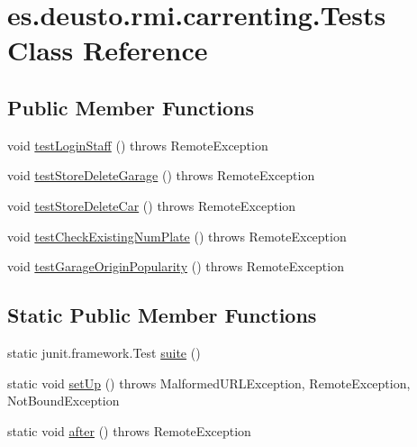 \hypertarget{classes_1_1deusto_1_1rmi_1_1carrenting_1_1_tests}{}\section{es.\+deusto.\+rmi.\+carrenting.\+Tests Class Reference}
\label{classes_1_1deusto_1_1rmi_1_1carrenting_1_1_tests}
\subsection*{Public Member Functions}
\begin{DoxyCompactItemize}
\item 
void \mbox{\hyperlink{classes_1_1deusto_1_1rmi_1_1carrenting_1_1_tests_ac0024402892b0be0c6a7e214c8594f82}{test\+Login\+Staff}} ()  throws Remote\+Exception 
\item 
void \mbox{\hyperlink{classes_1_1deusto_1_1rmi_1_1carrenting_1_1_tests_afc6f67fefbb2274c222cc554412d85c4}{test\+Store\+Delete\+Garage}} ()  throws Remote\+Exception 
\item 
void \mbox{\hyperlink{classes_1_1deusto_1_1rmi_1_1carrenting_1_1_tests_af8829dcf722f17efca1d53345b5a049a}{test\+Store\+Delete\+Car}} ()  throws Remote\+Exception 
\item 
void \mbox{\hyperlink{classes_1_1deusto_1_1rmi_1_1carrenting_1_1_tests_ab275c8fe4601f38f88adbe497c42fed2}{test\+Check\+Existing\+Num\+Plate}} ()  throws Remote\+Exception 
\item 
void \mbox{\hyperlink{classes_1_1deusto_1_1rmi_1_1carrenting_1_1_tests_a74d971547bb970852d80678b2004b0f5}{test\+Garage\+Origin\+Popularity}} ()  throws Remote\+Exception 
\end{DoxyCompactItemize}
\subsection*{Static Public Member Functions}
\begin{DoxyCompactItemize}
\item 
static junit.\+framework.\+Test \mbox{\hyperlink{classes_1_1deusto_1_1rmi_1_1carrenting_1_1_tests_aa86b64b0b8b0b8fc6fe0d690f047faa3}{suite}} ()
\item 
static void \mbox{\hyperlink{classes_1_1deusto_1_1rmi_1_1carrenting_1_1_tests_a1a620da71412f1f21332621c6bfd3452}{set\+Up}} ()  throws Malformed\+U\+R\+L\+Exception, Remote\+Exception, Not\+Bound\+Exception 
\item 
static void \mbox{\hyperlink{classes_1_1deusto_1_1rmi_1_1carrenting_1_1_tests_ae178c6eeb0adf18db0b0463190ecb073}{after}} ()  throws Remote\+Exception 
\end{DoxyCompactItemize}

